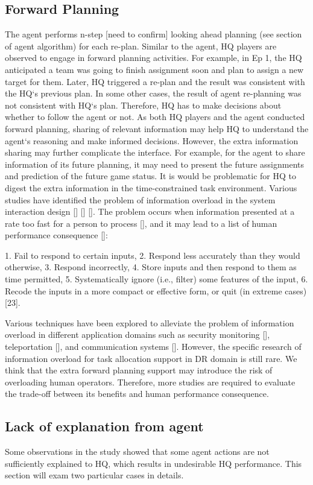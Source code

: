 \subsection{Forward Planning}
The agent performs n-step [need to confirm] looking ahead planning (see section of agent algorithm) for each re-plan. Similar to the agent, HQ players are observed to engage in forward planning activities. For example, in Ep 1, the HQ anticipated a team was going to finish assignment soon and plan to assign a new target for them. Later, HQ triggered a re-plan and the result was consistent with the HQ`s previous plan. In some other cases, the result of agent re-planning was not consistent with HQ`s plan. Therefore, HQ has to make decisions about whether to follow the agent or not. As both HQ players and the agent conducted forward planning, sharing of relevant information may help HQ to understand the agent`s reasoning and make informed decisions.  However, the extra information sharing may further complicate the interface. For example, for the agent to share information of its future planning, it may need to present the future assignments and prediction of the future game status. It is would be problematic for HQ to digest the extra information in the time-constrained task environment. Various studies have identified the problem of information overload in the system interaction design [] [] []. The problem occurs when information presented at a rate too fast for a person to process [], and it may lead to a list of human performance consequence []:

1. Fail to respond to certain inputs,
2. Respond less accurately than they would otherwise,
3. Respond incorrectly,
4. Store inputs and then respond to them as time permitted,
5. Systematically ignore (i.e., filter) some features of the input,
6. Recode the inputs in a more compact or effective form, or quit (in extreme cases) [23].

Various techniques have been explored to alleviate the problem of information overload in different application domains such as security monitoring [], teleportation [], and communication systems []. However, the specific research of information overload for task allocation support in DR domain is still rare. We think that the extra forward planning support may introduce the risk of overloading human operators. Therefore, more studies are required to evaluate the trade-off between its benefits and human performance consequence. 


\subsection{ Lack of explanation from agent }
Some observations in the study showed that some agent actions are not sufficiently explained to HQ, which results in undesirable HQ performance. This section will exam two particular cases in details.

